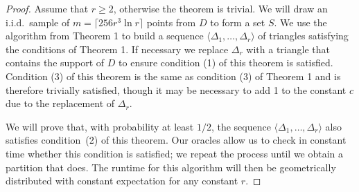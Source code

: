\documentclass{patmorin}
\begin{document}
\begin{proof}
Assume that $r \ge 2$, otherwise the theorem is trivial.
We will draw an i.i.d.\ sample of $m = \lceil 256r^3\ln r \rceil$
points from $D$ to form a set $S$.  We use the algorithm from Theorem
1 to build a sequence $\langle \Delta_1, \ldots, \Delta_r \rangle$
of triangles satisfying the conditions of Theorem 1.  If necessary we
replace $\Delta_r$ with a triangle that contains the support of $D$
to ensure condition (1) of this theorem is satisfied.  Condition (3) of
this theorem is the same as condition (3) of Theorem 1 and is therefore
trivially satisfied, though it may be necessary to add 1 to the constant
$c$ due to the replacement of $\Delta_r$.

We will prove that, with probability at least $1/2$, the sequence $\langle
\Delta_1, \ldots, \Delta_r \rangle$ also satisfies condition~(2) of
this theorem.  Our oracles allow us to check in constant time whether
this condition is satisfied; we repeat the process until we obtain
a partition that does.  The runtime for this algorithm will then be
geometrically distributed with constant expectation for any constant $r$.


\end{proof}
\end{document}
